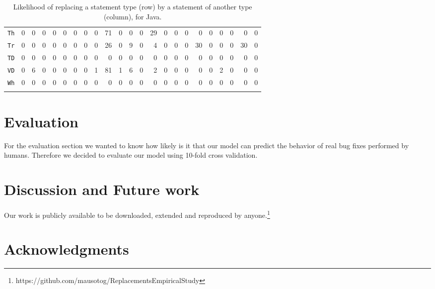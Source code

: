 \documentclass{sig-alternate-05-2015}
\begin{document}
\begin{table*}
{\begin{tabular}{l|rrrrrrrrrrrrrrrrrrrrrr}
\texttt{Th}	&0&	0&	0&	0&	0&	0&	0&	0&	71&	0&	0&	0&	29&	0&	0&	0&	0&	0&	0&	0&	0&	0\\
\texttt{Tr}	&0&	0&	0&	0&	0&	0&	0&	0&	26&	0&	9&	0&	4&	0&	0&	0&	30&	0&	0&	0&	30&	0\\
\texttt{TD}	&0&	0&	0&	0&	0&	0&	0&	0&	0&	0&	0&	0&	0&	0&	0&	0&	0&	0&	0&	0&	0&	0\\
\texttt{VD}	&0&	6&	0&	0&	0&	0&	0&	1&	81&	1&	6&	0&	2&	0&	0&	0&	0&	0&	2&	0&	0&	0\\
\texttt{Wh}	&0&	0&	0&	0&	0&	0&	0&	0&	0&	0&	0&	0&	0&	0&	0&	0&	0&	0&	0&	0&	0&	0\\
			\\ \bottomrule
		\end{tabular}
		}
		\caption{Likelihood of replacing a statement type (row) by a statement of
          another type (column), for Java.}\label{tab:likeliness}
\end{table*}


\section{Evaluation}\label{sec:stmtstudy}
For the evaluation section we wanted to know how likely is it that our model can predict the behavior of real bug fixes performed by humans.
Therefore we decided to evaluate our model using 10-fold cross validation.



\section{Discussion and Future work}
Our work is publicly available to be downloaded, extended and reproduced by anyone.\footnote{https://github.com/mausotog/ReplacementsEmpiricalStudy}


\section{Acknowledgments}



%
%


\end{document}
